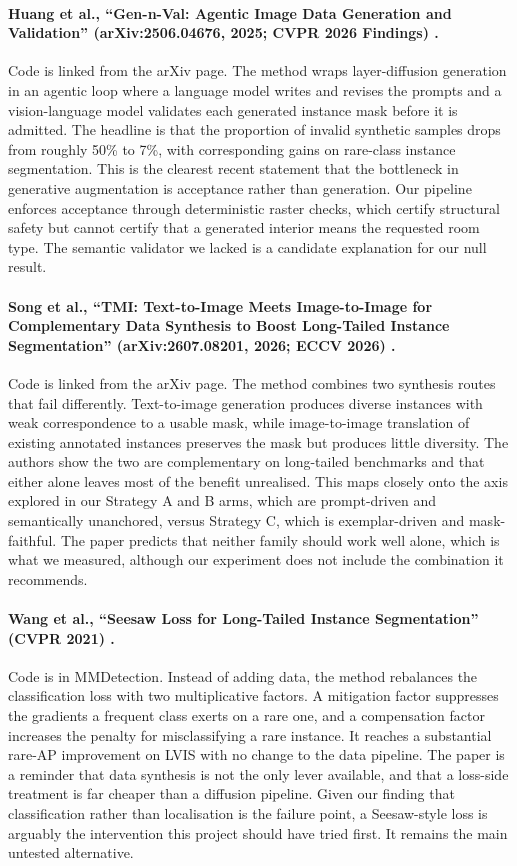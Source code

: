 \paragraph{Huang et al., ``Gen-n-Val: Agentic Image Data Generation and
Validation'' (arXiv:2506.04676, 2025; CVPR 2026 Findings)
\cite{huang2025gennval}.} Code is linked from the arXiv page. The method wraps
layer-diffusion generation in an agentic loop where a language model writes and
revises the prompts and a vision-language model validates each generated
instance mask before it is admitted. The headline is that the proportion of
invalid synthetic samples drops from roughly 50\% to 7\%, with corresponding
gains on rare-class instance segmentation. This is the clearest recent statement
that the bottleneck in generative augmentation is acceptance rather than
generation. Our pipeline enforces acceptance through deterministic raster
checks, which certify structural safety but cannot certify that a generated
interior means the requested room type. The semantic validator we lacked is a
candidate explanation for our null result.

\paragraph{Song et al., ``TMI: Text-to-Image Meets Image-to-Image for
Complementary Data Synthesis to Boost Long-Tailed Instance Segmentation''
(arXiv:2607.08201, 2026; ECCV 2026) \cite{song2026tmi}.} Code is linked from the
arXiv page. The method combines two synthesis routes that fail differently.
Text-to-image generation produces diverse instances with weak correspondence to
a usable mask, while image-to-image translation of existing annotated instances
preserves the mask but produces little diversity. The authors show the two are
complementary on long-tailed benchmarks and that either alone leaves most of the
benefit unrealised. This maps closely onto the axis explored in our Strategy A
and B arms, which are prompt-driven and semantically unanchored, versus Strategy
C, which is exemplar-driven and mask-faithful. The paper predicts that neither
family should work well alone, which is what we measured, although our
experiment does not include the combination it recommends.

\paragraph{Wang et al., ``Seesaw Loss for Long-Tailed Instance Segmentation''
(CVPR 2021) \cite{wang2021seesaw}.} Code is in MMDetection. Instead of adding
data, the method rebalances the classification loss with two multiplicative
factors. A mitigation factor suppresses the gradients a frequent class exerts on
a rare one, and a compensation factor increases the penalty for misclassifying a
rare instance. It reaches a substantial rare-AP improvement on LVIS with no
change to the data pipeline. The paper is a reminder that data synthesis is not
the only lever available, and that a loss-side treatment is far cheaper than a
diffusion pipeline. Given our finding that classification rather than
localisation is the failure point, a Seesaw-style loss is arguably the
intervention this project should have tried first. It remains the main untested
alternative.

